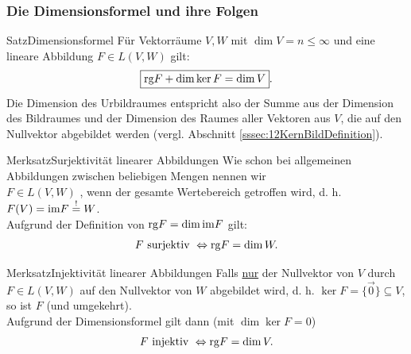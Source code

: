 \subsubsection{Die Dimensionsformel und ihre Folgen}\label{ssec:Dimensionsformel}
\begin{Satz}
{Satz}{Dimensionsformel}
Für Vektorräume $V,W$ mit $\dim V=n\leq \infty$ und eine lineare Abbildung $F\in L(V,W)$ gilt:
\begin{equation*}
    \boxed{\text{rg} F+\dim \ker F=\dim V}.
\end{equation*}
Die Dimension des Urbildraumes entspricht also der Summe aus der Dimension des Bildraumes und der Dimension des Raumes aller Vektoren aus $V$, die auf den Nullvektor abgebildet werden (vergl. Abschnitt \ref{sssec:12KernBildDefinition}).
\end{Satz}
\begin{Satz}
{Merksatz}{Surjektivität linearer Abbildungen}
Wie schon bei allgemeinen Abbildungen zwischen beliebigen Mengen nennen wir\\ $F\in L(V,W)$ , wenn der gesamte Wertebereich getroffen wird, d. h. $F(V)=\text{im} F\overset{!}{=}W$.\\
Aufgrund der Definition von $\text{rg} F=\dim \text{im} F$ gilt:
\begin{equation*}
    F\text{ surjektiv }\Leftrightarrow \text{rg} F=\dim W.
\end{equation*}
\end{Satz}
\begin{Satz}
{Merksatz}{Injektivität linearer Abbildungen}
Falls \underline{nur} der Nullvektor von $V$ durch $F\in L(V,W)$ auf den Nullvektor von $W$ abgebildet wird, d. h. $\ker F=\{\Vec{0}\}\subseteq V$, so ist $F$  (und umgekehrt).\\
Aufgrund der Dimensionsformel gilt dann (mit $\dim\ker F=0$)
\begin{equation*}
    F\text{ injektiv }\Leftrightarrow \text{rg} F=\dim V.
\end{equation*}
\end{Satz}
